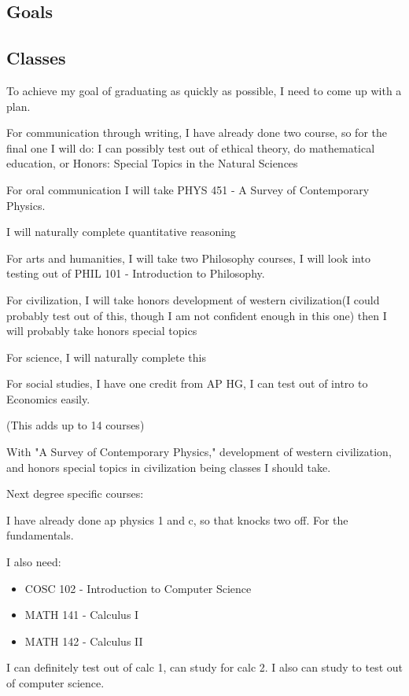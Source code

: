 \subsection{Goals}
\subsection{Classes}
\par To achieve my goal of graduating as quickly as possible, I need to come up with a plan.
\par For communication through writing, I have already done two course, so for the final one I will do: I can possibly test out of ethical theory, do mathematical education, or Honors: Special Topics in the Natural Sciences 
\par For oral communication I will take PHYS 451 - A Survey of Contemporary Physics.
\par I will naturally complete quantitative reasoning
\par For arts and humanities, I will take two Philosophy courses, I will look into testing out of PHIL 101 - Introduction to Philosophy.
\par For civilization, I will take honors development of western civilization(I could probably test out of this, though I am not confident enough in this one) then I will probably take honors special topics
\par For science, I will naturally complete this
\par For social studies, I have one credit from AP HG, I can test out of intro to Economics easily.
\par (This adds up to 14 courses)
\par With "A Survey of Contemporary Physics," development of western civilization, and honors special topics in civilization being classes I should take.
\\ 
\par Next degree specific courses:
\par I have already done ap physics 1 and c, so that knocks two off. For the fundamentals. 
\par I also need: 
\begin{itemize}
\item COSC 102 - Introduction to Computer Science 
\item MATH 141 - Calculus I 
\item MATH 142 - Calculus II 

\end{itemize}
\par I can definitely test out of calc 1, can study for calc 2. I also can study to test out of computer science.
